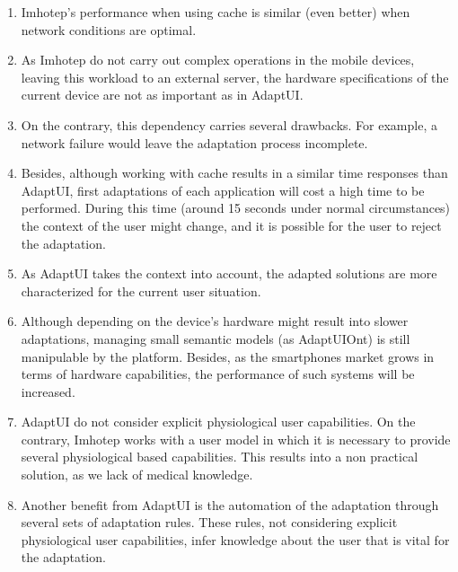 \begin{enumerate}[label=\alph*]
  \item Imhotep's performance when using cache is similar (even better) when
  network conditions are optimal. 
  
  \item As Imhotep do not carry out complex operations in the mobile devices,
  leaving this workload to an external server, the hardware specifications of 
  the current device are not as important as in AdaptUI.
  
  \item On the contrary, this dependency carries several drawbacks. For 
  example, a network failure would leave the adaptation process incomplete.
  
  \item Besides, although working with cache results in a similar time responses
  than AdaptUI, first adaptations of each application will cost a high time to
  be performed. During this time (around 15 seconds under normal circumstances)
  the context of the user might change, and it is possible for the user to 
  reject the adaptation.
  
  \item As AdaptUI takes the context into account, the adapted solutions are
  more characterized for the current user situation.
  
  \item Although depending on the device's hardware might result into slower
  adaptations, managing small semantic models (as AdaptUIOnt) is still 
  manipulable by the platform. Besides, as the smartphones market grows in terms
  of hardware capabilities, the performance of such systems will be increased.
  
  \item AdaptUI do not consider explicit physiological user capabilities. On 
  the contrary, Imhotep works with a user model in which it is necessary to
  provide several physiological based capabilities. This results into a non
  practical solution, as we lack of medical knowledge.
  
  \item Another benefit from AdaptUI is the automation of the adaptation 
  through several sets of adaptation rules. These rules, not considering 
  explicit physiological user capabilities, infer knowledge about the user that
  is vital for the adaptation.
\end{enumerate}